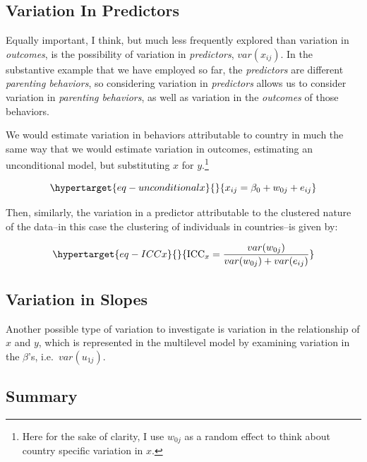 \documentclass[
  letterpaper,
  DIV=11,
  numbers=noendperiod]{scrreprt}
\begin{document}
\hypertarget{variation-in-predictors}{%
\subsection{Variation In Predictors}\label{variation-in-predictors}}

Equally important, I think, but much less frequently explored than
variation in \emph{outcomes}, is the possibility of variation in
\emph{predictors}, \(var(x_{ij})\). In the substantive example that we
have employed so far, the \emph{predictors} are different
\emph{parenting behaviors}, so considering variation in
\emph{predictors} allows us to consider variation in \emph{parenting
behaviors}, as well as variation in the \emph{outcomes} of those
behaviors.

We would estimate variation in behaviors attributable to country in much
the same way that we would estimate variation in outcomes, estimating an
unconditional model, but substituting \(x\) for \(y\).\footnote{Here for
  the sake of clarity, I use \(w_{0j}\) as a random effect to think
  about country specific variation in \(x\).}

\begin{equation}\protect\hypertarget{eq-unconditionalx}{}{x_{ij} = \beta_0 + w_{0j} + e_{ij}}\label{eq-unconditionalx}\end{equation}

Then, similarly, the variation in a predictor attributable to the
clustered nature of the data--in this case the clustering of individuals
in countries--is given by:

\begin{equation}\protect\hypertarget{eq-ICCx}{}{\text{ICC}_x = \frac{var(w_{0j})}{var(w_{0j}) + var(e_{ij})}}\label{eq-ICCx}\end{equation}

\hypertarget{variation-in-slopes}{%
\subsection{Variation in Slopes}\label{variation-in-slopes}}

Another possible type of variation to investigate is variation in the
relationship of \(x\) and \(y\), which is represented in the multilevel
model by examining variation in the \(\beta\)'s, i.e.~\(var(u_{1j})\).

\hypertarget{summary}{%
\subsection{Summary}\label{summary}}
\end{document}
